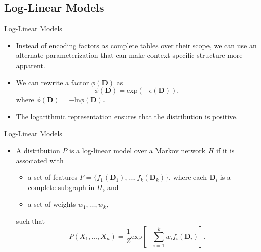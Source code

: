 \documentclass[11pt]{beamer}
\begin{document}

\subsection{Log-Linear Models}

\begin{frame}{Log-Linear Models}
\begin{itemize}
	\item Instead of encoding factors as complete tables over their scope,
	we can use an alternate parameterization that can make context-specific
	structure more apparent.
	\item We can rewrite a factor $\phi(\boldsymbol{D})$ as
	\[
		\phi(\boldsymbol{D}) = \text{exp}(-\epsilon(\boldsymbol{D})),
	\]
	where $\phi(\boldsymbol{D}) = -\text{ln}\phi(\boldsymbol{D})$.
	\item The logarithmic representation ensures that the distribution is
	positive.
\end{itemize}
\end{frame}

\begin{frame}{Log-Linear Models}
\begin{itemize}
	\item A distribution $P$ is a log-linear model over a Markov network $H$
	if it is associated with
	\begin{itemize}
		\item a set of features $F = \{f_{1}(\boldsymbol{D}_{1}),
		\ldots, f_{k}(\boldsymbol{D}_{k})\}$, where each
		$\boldsymbol{D}_{i}$ is a complete subgraph in $H$, and
		\item a set of weights $w_{1}, \ldots, w_{k}$,
	\end{itemize}
	such that
	\[
		P(X_{1}, \ldots, X_{n}) =
		\frac{1}{Z}\text{exp}\left[-\sum_{i=1}^{k}
		w_{i}f_{i}(\boldsymbol{D}_{i})\right].
	\]
\end{itemize}
\end{frame}
\end{document}

